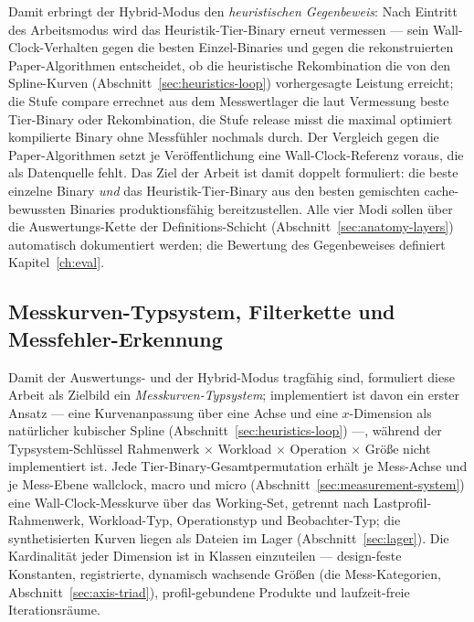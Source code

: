 \begin{nurkurz}
Damit erbringt der Hybrid-Modus den \emph{heuristischen Gegenbeweis}: Nach Eintritt des Arbeitsmodus wird das
Heuristik-Tier-Binary erneut vermessen --- sein Wall-Clock-Verhalten gegen die besten Einzel-Binaries und gegen
die rekonstruierten Paper-Algorithmen entscheidet, ob die heuristische Rekombination die von den Spline-Kurven
(Abschnitt~\ref{sec:heuristics-loop}) vorhergesagte Leistung erreicht; die Stufe compare errechnet aus dem
Messwertlager die laut Vermessung beste Tier-Binary oder Rekombination, die Stufe release misst die maximal
optimiert kompilierte Binary ohne Messfühler nochmals durch. Der Vergleich gegen die Paper-Algorithmen setzt je
Veröffentlichung eine Wall-Clock-Referenz voraus, die als Datenquelle fehlt. Das Ziel der Arbeit ist damit
doppelt formuliert: die beste einzelne Binary \emph{und} das Heuristik-Tier-Binary aus den besten gemischten
cache-bewussten Binaries produktionsfähig bereitzustellen. Alle vier Modi sollen über die Auswertungs-Kette der
Definitions-Schicht (Abschnitt~\ref{sec:anatomy-layers}) automatisch dokumentiert werden; die Bewertung des
Gegenbeweises definiert Kapitel~\ref{ch:eval}.
\subsection{Messkurven-Typsystem, Filterkette und Messfehler-Erkennung}\label{sec:heuristics-curves}
Damit der Auswertungs- und der Hybrid-Modus tragfähig sind, formuliert diese Arbeit als Zielbild ein
\emph{Messkurven-Typsystem}; implementiert ist davon ein erster Ansatz --- eine Kurvenanpassung über eine Achse
und eine $x$-Dimension als natürlicher kubischer Spline (Abschnitt~\ref{sec:heuristics-loop}) ---, während der
Typsystem-Schlüssel Rahmenwerk $\times$ Workload $\times$ Operation $\times$ Größe nicht implementiert ist. Jede
Tier-Binary-Gesamtpermutation erhält je Mess-Achse und je Mess-Ebene wallclock, macro und micro
(Abschnitt~\ref{sec:measurement-system}) eine Wall-Clock-Messkurve über das Working-Set, getrennt nach
Lastprofil-Rahmenwerk, Workload-Typ, Operationstyp und Beobachter-Typ; die synthetisierten Kurven liegen als
Dateien im Lager (Abschnitt~\ref{sec:lager}). Die Kardinalität jeder Dimension ist in Klassen einzuteilen ---
design-feste Konstanten, registrierte, dynamisch wachsende Größen (die Mess-Kategorien,
Abschnitt~\ref{sec:axis-triad}), profil-gebundene Produkte und laufzeit-freie Iterationsräume.


\end{nurkurz}
